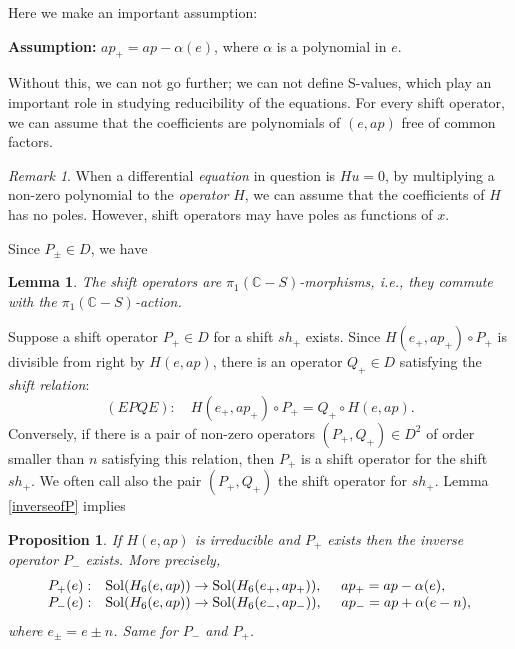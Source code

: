 \documentclass[a4paper,12pt]{article}
\newtheorem{lemma}[thm]{Lemma}
\newtheorem{prp}[thm]{Proposition}
\theoremstyle{definition}
\theoremstyle{remark}
\newtheorem{remark}[thm]{Remark}
\numberwithin{equation}{section} %
\begin{document}
Here we make an important assumption:
\par\smallskip\noindent
{\bf Assumption:} $ap_+=ap-\alpha(e)$, where $\alpha$ is a polynomial in $e$.\par\smallskip
Without this, we can not go further; we can not define S-values, which play an important role in studying reducibility of the equations.
For every shift operator, we can assume that the  coefficients are polynomials of $(e,ap)$ free of common factors.
\begin{remark}
   When a differential {\it equation} in question is $Hu=0$, by multiplying a non-zero polynomial to the {\it operator} $H$, we can assume that the coefficients of $H$ has no poles. However, shift operators may have poles as functions of $x$.
  \end{remark}
Since $P_\pm\in D$, we have

\begin{lemma}\label{pi1morphsim}The shift operators
  are $\pi_1(\mathbb{C}-S)$-morphisms, {\it i.e.},
  they commute with the $\pi_1(\mathbb{C}-S)$-action.
\end{lemma}
Suppose a shift operator $P_{+}\in D$ for a shift $sh_+$ exists.
Since $H(e_+,ap_+)\circ P_{+}$ is divisible from right by $H(e,ap)$,
there is an operator $Q_{+}\in D$ satisfying the {\it shift relation}:
  $$(EPQE):\quad H(e_+,ap_+)\circ P_{+}=Q_{+}\circ H(e,ap).$$
Conversely, if there is a pair of non-zero operators $(P_{+},Q_{+})\in D^2$
of order smaller than $n$ satisfying this relation,
then $P_{+}$ is a shift operator for the shift $sh_+$.
We often call also the pair $(P_{+},Q_{+})$
the shift operator for $sh_+$.
  Lemma \ref{inverseofP} implies
\begin{prp}\label{inverseofshiftop}If $H(e,ap)$ is irreducible and $P_{+}$
exists then the inverse operator $P_{-}$
exists. More precisely, 
$$\begin{array}{ll}
P_+(e):& {\rm Sol}(H_6(e,ap))\rightarrow {\rm Sol}(H_6(e_+,ap_+)),\quad \ ap_+=ap-\alpha(e),\\%
P_-(e):& {\rm Sol}(H_6(e,ap))\rightarrow {\rm Sol}(H_6(e_-,ap_-)),\quad \ ap_-=ap+\alpha(e-n),\end{array}
$$
where 
$e_\pm=e\pm n$. Same for $P_-$ and $P_+$.
\end{prp}
\end{document}
